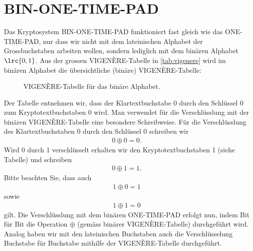\section{BIN-ONE-TIME-PAD}
Das Kryptosystem BIN-ONE-TIME-PAD funktioniert fast gleich wie das ONE-TIME-PAD, nur dass wir nicht mit dem lateinischen Alphabet der Grossbuchstaben arbeiten wollen, sondern lediglich mit dem binären Alphabet $\lrc{0,1}$. Aus der grossen VIGENÈRE-Tabelle in \cref{tab:vigenere} wird im binären Alphabet die übersichtliche (binäre) VIGENÈRE-Tabelle:
\begin{figure}[H]
	\centering
	\caption{VIGENÈRE-Tabelle für das binäre Alphabet.}
	\label{fig:VigenereBin}
\end{figure}
\noindent
Der Tabelle entnehmen wir, dass der Klartextbuchstabe $0$ durch den Schlüssel $0$ zum Kryptotextbuchstaben $0$ wird. Man verwendet für die Verschlüsslung mit der binären VIGENÈRE-Tabelle eine besondere Schreibweise. Für die Verschlüsslung des Klartextbuchstaben $0$ durch den Schlüssel $0$ schreiben wir
\begin{align*}
	0 \oplus 0 = 0.
\end{align*}
Wird 0 durch 1 verschlüsselt erhalten wir den Kryptotextbuchstaben 1 (siehe Tabelle) und schreiben
\begin{align*}
	0 \oplus 1 = 1.
\end{align*}
Bitte beachten Sie, dass auch
\begin{align*}
	1 \oplus 0 = 1
\end{align*}
sowie
\begin{align*}
	1 \oplus 1 = 0
\end{align*}
gilt.
\noindent
Die Verschlüsslung mit dem binären ONE-TIME-PAD erfolgt nun, indem Bit für Bit die Operation $\oplus$ (gemäss binärer VIGENÈRE-Tabelle) durchgeführt wird. Analog haben wir mit den lateinischen Buchstaben auch die Verschlüsselung Buchstabe für Buchstabe mithilfe der VIGENÈRE-Tabelle durchgeführt.

